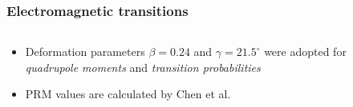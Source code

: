 \documentclass{beamer}
\begin{document}
\begin{frame}
  \frametitle{Electromagnetic transitions}
  \begin{columns}
    \begin{column}{0.75\textwidth}
  \begin{itemize}
    \item Deformation parameters $\beta=0.24$ and $\gamma=21.5^\circ$ were adopted for \emph{quadrupole moments} and \emph{transition probabilities}
    \item \par PRM values are calculated by Chen et al.
  \end{itemize}
\end{column}
\begin{column}{0.25\textwidth}
  \begin{table}
    \centering
  \end{table}
\end{column}
\end{columns}
\end{frame}
\end{document}
